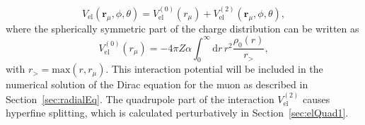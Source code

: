 \begin{equation}
\label{eq:quadInt}
V_{\text{el}}(\mathbf{r}_\mu,\phi,\theta) = V^{(0)}_{\text{el}}(r_\mu) + V^{(2)}_{\text{el}}(\mathbf{r}_\mu,\phi,\theta),
\end{equation}
where the spherically symmetric part of the charge distribution can be written as
\begin{equation}
\label{eq:Hmonopole}
V^{(0)}_{\text{el}}(r_\mu)= - 4 \pi Z\alpha \int_0^\infty \mathrm{d}r \, r^2 \frac{\rho_0(r)}{r_>},
\end{equation}
with $r_>=\text{max}(r,r_\mu)$. This interaction potential will be included in the numerical solution of the Dirac equation for the muon as described in Section~\ref{sec:radialEq}. The quadrupole part of the interaction $V^{(2)}_{\text{el}}$ causes hyperfine splitting, which is calculated perturbatively in Section~\ref{sec:elQuad1}.\\


